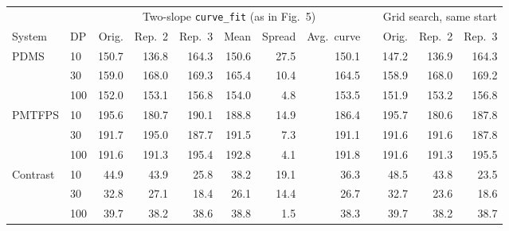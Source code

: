 \begin{tabular}{llrrrrrrcrrr}
\toprule
 & & \multicolumn{6}{c}{Two-slope \texttt{curve\_fit} (as in Fig.~5)} & & \multicolumn{3}{c}{Grid search, same start} \\
\cmidrule(lr){3-8}\cmidrule(lr){10-12}
System & DP & Orig. & Rep.~2 & Rep.~3 & Mean & Spread & Avg.\ curve & & Orig. & Rep.~2 & Rep.~3 \\
\midrule
PDMS & 10 & 150.7 & 136.8 & 164.3 & 150.6 & 27.5 & 150.1 & & 147.2 & 136.9 & 164.3 \\
 & 30 & 159.0 & 168.0 & 169.3 & 165.4 & 10.4 & 164.5 & & 158.9 & 168.0 & 169.2 \\
 & 100 & 152.0 & 153.1 & 156.8 & 154.0 & 4.8 & 153.5 & & 151.9 & 153.2 & 156.8 \\
\midrule
PMTFPS & 10 & 195.6 & 180.7 & 190.1 & 188.8 & 14.9 & 186.4 & & 195.7 & 180.6 & 187.8 \\
 & 30 & 191.7 & 195.0 & 187.7 & 191.5 & 7.3 & 191.1 & & 191.6 & 191.6 & 187.8 \\
 & 100 & 191.6 & 191.3 & 195.4 & 192.8 & 4.1 & 191.8 & & 191.6 & 191.3 & 195.5 \\
\midrule
Contrast & 10 & 44.9 & 43.9 & 25.8 & 38.2 & 19.1 & 36.3 & & 48.5 & 43.8 & 23.5 \\
 & 30 & 32.8 & 27.1 & 18.4 & 26.1 & 14.4 & 26.7 & & 32.7 & 23.6 & 18.6 \\
 & 100 & 39.7 & 38.2 & 38.6 & 38.8 & 1.5 & 38.3 & & 39.7 & 38.2 & 38.7 \\
\bottomrule
\end{tabular}
